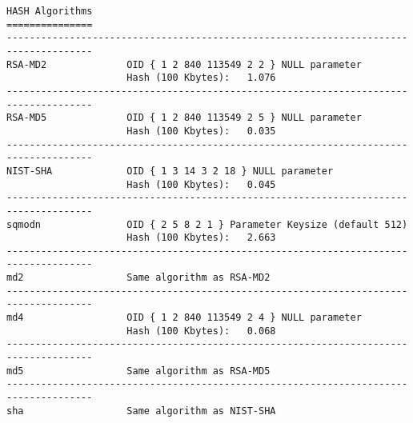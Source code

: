 {\begin{verbatim}
HASH Algorithms
===============
-------------------------------------------------------------------------------------
RSA-MD2              OID { 1 2 840 113549 2 2 } NULL parameter
                     Hash (100 Kbytes):   1.076  
-------------------------------------------------------------------------------------
RSA-MD5              OID { 1 2 840 113549 2 5 } NULL parameter
                     Hash (100 Kbytes):   0.035  
-------------------------------------------------------------------------------------
NIST-SHA             OID { 1 3 14 3 2 18 } NULL parameter
                     Hash (100 Kbytes):   0.045  
-------------------------------------------------------------------------------------
sqmodn               OID { 2 5 8 2 1 } Parameter Keysize (default 512)
                     Hash (100 Kbytes):   2.663  
-------------------------------------------------------------------------------------
md2                  Same algorithm as RSA-MD2
-------------------------------------------------------------------------------------
md4                  OID { 1 2 840 113549 2 4 } NULL parameter
                     Hash (100 Kbytes):   0.068  
-------------------------------------------------------------------------------------
md5                  Same algorithm as RSA-MD5
-------------------------------------------------------------------------------------
sha                  Same algorithm as NIST-SHA


\end{verbatim}}
